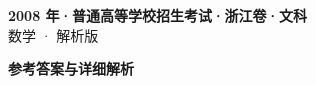 \documentclass[zihao=-4, a4paper]{ctexart}
\begin{document}
\begin{center}
  {\Large\bfseries 2008 年·普通高等学校招生考试·浙江卷·文科}\\[4pt]
  {\large 数学 · 解析版}
\end{center}
\medskip
{}

\clearpage
{}
\begin{center}{\Large\bfseries 参考答案与详细解析}\end{center}
\medskip

\end{document}
